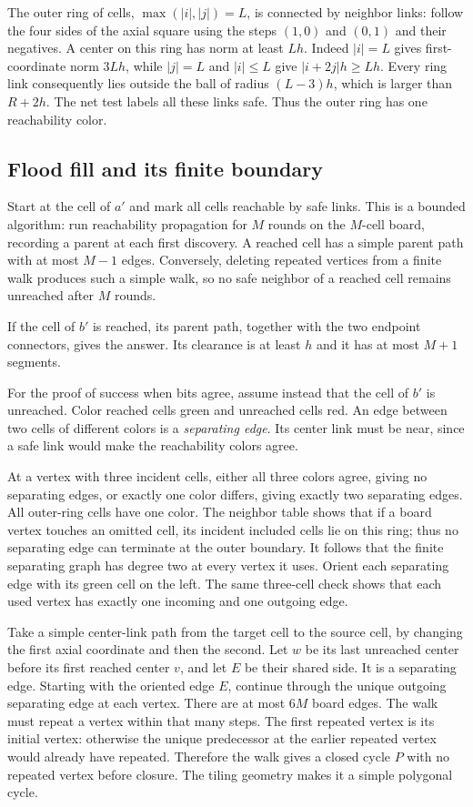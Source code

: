 The outer ring of cells, $\max(|i|,|j|)=L$, is connected by
neighbor links: follow the four sides of the axial square using
the steps $(1,0)$ and $(0,1)$ and their negatives.
A center on this ring has norm at least $Lh$.
Indeed $|i|=L$ gives first-coordinate norm $3Lh$, while
$|j|=L$ and $|i|\le L$ give $|i+2j|h\ge Lh$.
Every ring link consequently lies outside the ball of radius
$(L-3)h$, which is larger than $R+2h$. The net test labels all
these links safe. Thus the outer ring has one reachability color.

\subsection{Flood fill and its finite boundary}

Start at the cell of $a'$ and mark all cells reachable by safe
links. This is a bounded algorithm: run reachability propagation
for $M$ rounds on the $M$-cell board, recording a parent at each
first discovery. A reached cell has a simple parent path with at
most $M-1$ edges. Conversely, deleting repeated vertices from a
finite walk produces such a simple walk, so no safe neighbor of
a reached cell remains unreached after $M$ rounds.

If the cell of $b'$ is reached, its parent path, together with the
two endpoint connectors, gives the answer. Its clearance is at
least $h$ and it has at most $M+1$ segments.

For the proof of success when bits agree, assume instead that the
cell of $b'$ is unreached. Color reached cells green and unreached
cells red. An edge between two cells of different colors is a
\emph{separating edge}. Its center link must be near, since a safe
link would make the reachability colors agree.

At a vertex with three incident cells, either all three colors
agree, giving no separating edges, or exactly one color differs,
giving exactly two separating edges. All outer-ring cells have
one color. The neighbor table shows that if a board vertex touches
an omitted cell, its incident included cells lie on this ring;
thus no separating edge can terminate at the outer boundary.
It follows that the finite separating graph has degree two
at every vertex it uses. Orient each separating edge with its
green cell on the left. The same three-cell check shows that
each used vertex has exactly one incoming and one outgoing edge.

Take a simple center-link path from the target cell to the source
cell, by changing the first axial coordinate and then the second.
Let $w$ be its last unreached center before its first reached
center $v$, and let $E$ be their shared side. It is a separating edge.
Starting with the oriented edge $E$, continue through the unique
outgoing separating edge at each vertex. There are at most $6M$ board edges.
The walk must repeat a vertex within that many steps.
The first repeated vertex is its initial vertex: otherwise the
unique predecessor at the earlier repeated vertex would already
have repeated. Therefore the walk gives a closed cycle $P$
with no repeated vertex before closure.
The tiling geometry makes it a simple polygonal cycle.

